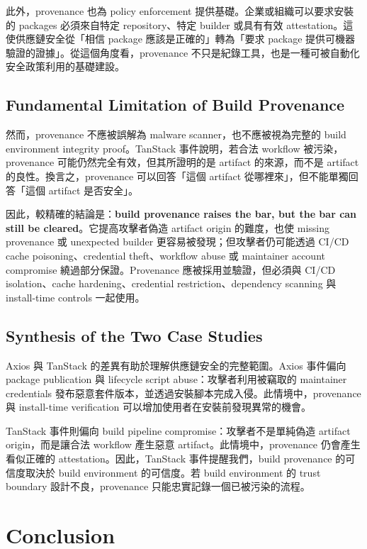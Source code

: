 \documentclass[12pt,a4paper]{article}
\begin{document}
此外，provenance 也為 policy enforcement 提供基礎。企業或組織可以要求安裝的 packages 必須來自特定 repository、特定 builder 或具有有效 attestation。這使供應鏈安全從「相信 package 應該是正確的」轉為「要求 package 提供可機器驗證的證據」。從這個角度看，provenance 不只是紀錄工具，也是一種可被自動化安全政策利用的基礎建設。

\subsection{Fundamental Limitation of Build Provenance}

然而，provenance 不應被誤解為 malware scanner，也不應被視為完整的 build environment integrity proof。TanStack 事件說明，若合法 workflow 被污染，provenance 可能仍然完全有效，但其所證明的是 artifact 的來源，而不是 artifact 的良性。換言之，provenance 可以回答「這個 artifact 從哪裡來」，但不能單獨回答「這個 artifact 是否安全」。

因此，較精確的結論是：\textbf{build provenance raises the bar, but the bar can still be cleared}。它提高攻擊者偽造 artifact origin 的難度，也使 missing provenance 或 unexpected builder 更容易被發現；但攻擊者仍可能透過 CI/CD cache poisoning、credential theft、workflow abuse 或 maintainer account compromise 繞過部分保證。Provenance 應被採用並驗證，但必須與 CI/CD isolation、cache hardening、credential restriction、dependency scanning 與 install-time controls 一起使用。

\subsection{Synthesis of the Two Case Studies}

Axios 與 TanStack 的差異有助於理解供應鏈安全的完整範圍。Axios 事件偏向 package publication 與 lifecycle script abuse：攻擊者利用被竊取的 maintainer credentials 發布惡意套件版本，並透過安裝腳本完成入侵。此情境中，provenance 與 install-time verification 可以增加使用者在安裝前發現異常的機會。

TanStack 事件則偏向 build pipeline compromise：攻擊者不是單純偽造 artifact origin，而是讓合法 workflow 產生惡意 artifact。此情境中，provenance 仍會產生看似正確的 attestation。因此，TanStack 事件提醒我們，build provenance 的可信度取決於 build environment 的可信度。若 build environment 的 trust boundary 設計不良，provenance 只能忠實記錄一個已被污染的流程。

\section{Conclusion}
\end{document}
